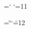 





\chardef\atcode=\catcode`\@	%
\catcode`\@=11			%


\chardef\dblcode=\catcode`\"	%
\catcode`\"=12			%




